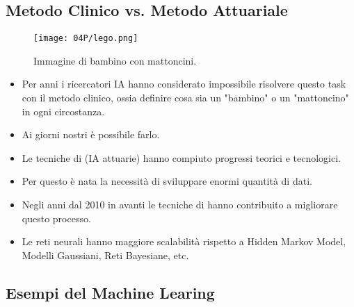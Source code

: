 \subsection{Metodo Clinico vs. Metodo Attuariale}


\begin{figure}[h]
    \centering
    \texttt{[image: 04P/lego.png]}
    \caption{Immagine di bambino con mattoncini.}
    \label{fig:mat}
\end{figure}


\begin{itemize}
  \item Per anni i ricercatori IA hanno considerato impossibile risolvere questo task con il metodo clinico, ossia definire cosa sia un "bambino" o un "mattoncino" in ogni circostanza. 
  \item Ai giorni nostri è possibile farlo.
  \item Le tecniche di  (IA attuarie) hanno compiuto progressi teorici e tecnologici. 
  \item Per questo è nata la necessità di sviluppare enormi quantità di dati.
  \item Negli anni dal 2010 in avanti le tecniche di  hanno contribuito a migliorare questo processo.
  \item Le reti neurali hanno maggiore scalabilità rispetto a Hidden Markov Model, Modelli Gaussiani, Reti Bayesiane, etc.
\end{itemize}


\subsection{Esempi del Machine Learing}

